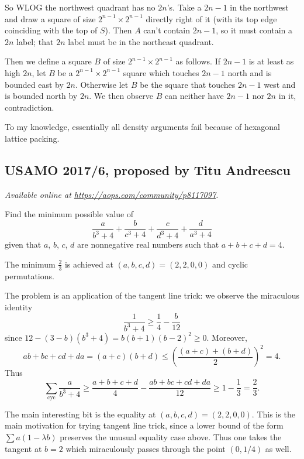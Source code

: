 \documentclass[11pt]{scrartcl}
\begin{document}
So WLOG the northwest quadrant has no $2n$'s.
Take a $2n-1$ in the northwest and draw a square of size $2^{n-1} \times 2^{n-1}$
directly right of it (with its top edge coinciding with the top of $S$).
Then $A$ can't contain $2n-1$, so it must contain a $2n$ label;
that $2n$ label must be in the northeast quadrant.

Then we define a square $B$ of size $2^{n-1} \times 2^{n-1}$ as follows.
If $2n-1$ is at least as high $2n$, let $B$ be a $2^{n-1} \times 2^{n-1}$
square which touches $2n-1$ north and is bounded east by $2n$.
Otherwise let $B$ be the square that touches $2n-1$ west
and is bounded north by $2n$.
We then observe $B$ can neither have $2n-1$ nor $2n$ in it, contradiction.

\begin{remark*}
  To my knowledge, essentially all density arguments fail
  because of hexagonal lattice packing.
\end{remark*}
\pagebreak

\subsection{USAMO 2017/6, proposed by Titu Andreescu}
\textsl{Available online at \url{https://aops.com/community/p8117097}.}
\begin{mdframed}[style=mdpurplebox,frametitle={Problem statement}]
Find the minimum possible value of
\[ \frac{a}{b^3+4} + \frac{b}{c^3+4}
  + \frac{c}{d^3+4} + \frac{d}{a^3+4} \]
given that $a$, $b$, $c$, $d$ are nonnegative real numbers
such that $a+b+c+d=4$.
\end{mdframed}
The minimum $\frac23$ is achieved
at $(a,b,c,d) = (2,2,0,0)$ and cyclic permutations.

The problem is an application of the tangent line trick:
we observe the miraculous identity
\[ \frac{1}{b^3+4} \ge \frac14 - \frac{b}{12} \]
since $12-(3-b)(b^3+4) = b(b+1)(b-2)^2 \ge 0$.
Moreover,
\[ ab+bc+cd+da = (a+c)(b+d)
  \le \left( \frac{(a+c)+(b+d)}{2} \right)^2 = 4.  \]
Thus
\[ \sum_{\text{cyc}} \frac{a}{b^3+4}
  \ge \frac{a+b+c+d}{4} - \frac{ab+bc+cd+da}{12}
  \ge 1 - \frac13 = \frac23. \]

\begin{remark*}
  The main interesting bit is the equality at $(a,b,c,d) = (2,2,0,0)$.
  This is the main motivation for trying tangent line trick,
  since a lower bound of the form $\sum a(1-\lambda b)$
  preserves the unusual equality case above.
  Thus one takes the tangent at $b=2$ which miraculously
  passes through the point $(0,1/4)$ as well.
\end{remark*}
\pagebreak
\end{document}
